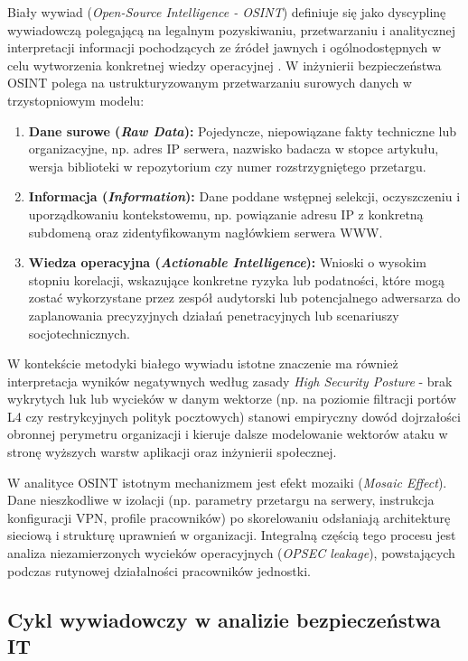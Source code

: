 Biały wywiad (\textit{Open-Source Intelligence - OSINT}) definiuje się jako dyscyplinę wywiadowczą polegającą na legalnym pozyskiwaniu, przetwarzaniu i analitycznej interpretacji informacji pochodzących ze źródeł jawnych i ogólnodostępnych w celu wytworzenia konkretnej wiedzy operacyjnej \cite{bazzell2023,nist_sp800_115}. W inżynierii bezpieczeństwa OSINT polega na ustrukturyzowanym przetwarzaniu surowych danych w trzystopniowym modelu:
\begin{enumerate}
    \item \textbf{Dane surowe (\textit{Raw Data}):} Pojedyncze, niepowiązane fakty techniczne lub organizacyjne, np. adres IP serwera, nazwisko badacza w stopce artykułu, wersja biblioteki w repozytorium czy numer rozstrzygniętego przetargu.
    \item \textbf{Informacja (\textit{Information}):} Dane poddane wstępnej selekcji, oczyszczeniu i uporządkowaniu kontekstowemu, np. powiązanie adresu IP z konkretną subdomeną  oraz zidentyfikowanym nagłówkiem serwera WWW.
    \item \textbf{Wiedza operacyjna (\textit{Actionable Intelligence}):} Wnioski o wysokim stopniu korelacji, wskazujące konkretne ryzyka lub podatności, które mogą zostać wykorzystane przez zespół audytorski lub potencjalnego adwersarza do zaplanowania precyzyjnych działań penetracyjnych lub scenariuszy socjotechnicznych.
\end{enumerate}

W kontekście metodyki białego wywiadu istotne znaczenie ma również interpretacja wyników negatywnych według zasady \textit{High Security Posture} - brak wykrytych luk lub wycieków w danym wektorze (np. na poziomie filtracji portów L4 czy restrykcyjnych polityk pocztowych) stanowi empiryczny dowód dojrzałości obronnej perymetru organizacji i kieruje dalsze modelowanie wektorów ataku w stronę wyższych warstw aplikacji oraz inżynierii społecznej.

W analityce OSINT istotnym mechanizmem jest efekt mozaiki (\textit{Mosaic Effect}). Dane nieszkodliwe w izolacji (np. parametry przetargu na serwery, instrukcja konfiguracji VPN, profile pracowników) po skorelowaniu odsłaniają architekturę sieciową i strukturę uprawnień w organizacji. Integralną częścią tego procesu jest analiza niezamierzonych wycieków operacyjnych (\textit{OPSEC leakage}), powstających podczas rutynowej działalności pracowników jednostki.

\subsection{Cykl wywiadowczy w analizie bezpieczeństwa IT}\label{subsec:cykl-wywiadowczy}

